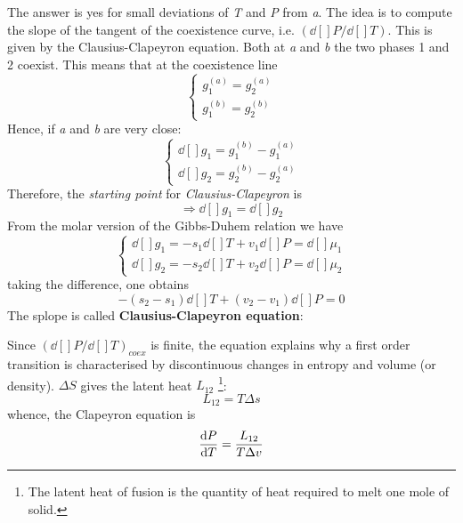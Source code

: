 \documentclass[../main/main.tex]{subfiles}
\begin{document}
The answer is yes for small deviations of \emph{T} and \emph{P} from \emph{a}. The idea is to compute the slope of the tangent of the coexistence curve, i.e. \( (\dd[]{P}/\dd[]{T}  )  \). This is given by the Clausius-Clapeyron equation.
Both at \emph{a} and \emph{b} the two phases 1 and 2 coexist. This means  that at the coexistence line
\begin{equation}
  \begin{cases}
   g_1^{(a)} = g_2^{(a)}\\
   g_1^{(b)} = g_2^{(b)}
  \end{cases}
\label{eq:}
\end{equation}
Hence, if \emph{a} and \emph{b} are very close:
\begin{equation}
  \begin{cases}
  \dd[]{g_1} = g_1^{(b)} - g_1^{(a)} \\
  \dd[]{g_2} = g_2^{(b)} - g_2^{(a)}
  \end{cases}
\label{eq:}
\end{equation}
Therefore, the \emph{starting point} for \emph{Clausius-Clapeyron} is
\begin{equation}
  \Rightarrow \dd[]{g_1} =\dd[]{g_2}
  \label{eq:}
\end{equation}
From the molar version of the Gibbs-Duhem relation we have
\begin{equation}
  \begin{cases}
   \dd[]{g_1} = -s_1 \dd[]{T} + v_1 \dd[]{P} = \dd[]{\mu _1}    \\
   \dd[]{g_2} = -s_2 \dd[]{T} + v_2 \dd[]{P} = \dd[]{\mu _2}
  \end{cases}
\label{eq:}
\end{equation}
taking the difference, one obtains
\begin{equation*}
  -(s_2 - s_1) \dd[]{T} + (v_2 - v_1) \dd[]{P} = 0
\end{equation*}
The splope is called \textbf{Clausius-Clapeyron equation}:
\begin{remark}
Since \( (\dd[]{P}/\dd[]{T})_{coex}   \) is finite, the equation explains why a first order transition is characterised by discontinuous changes in entropy and volume (or density). \( \Delta S \)  gives the latent heat \( L_{12} \) \footnote{The latent heat of fusion is the quantity of heat required to melt one mole of solid.}:
\begin{equation}
  L_{12} = T \Delta s
\end{equation}
whence, the Clapeyron equation is
\begin{equation}
  \dv{P}{T}  = \frac{L_{12}}{T \Delta v}
\end{equation}
\end{remark}
\end{document}
